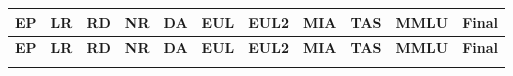 \documentclass[11pt]{article}
\begin{document}
\begin{longtable}[h]{|r|r|l|l|l|l|l|r|r|l|r|}
\hline
\multicolumn{1}{|c|}{\textbf{EP}} & \multicolumn{1}{c|}{\textbf{LR}} & \multicolumn{1}{c|}{\textbf{RD}} & \multicolumn{1}{c|}{\textbf{NR}} & \multicolumn{1}{c|}{\textbf{DA}} & \multicolumn{1}{c|}{\textbf{EUL}} & \multicolumn{1}{c|}{\textbf{EUL2}} & \multicolumn{1}{c|}{\textbf{MIA}} & \multicolumn{1}{c|}{\textbf{TAS}} & \multicolumn{1}{c|}{\textbf{MMLU}} & \multicolumn{1}{c|}{\textbf{Final}} \\ 
\hline
\endfirsthead

\hline
\multicolumn{1}{|c|}{\textbf{EP}} & \multicolumn{1}{c|}{\textbf{LR}} & \multicolumn{1}{c|}{\textbf{RD}} & \multicolumn{1}{c|}{\textbf{NR}} & \multicolumn{1}{c|}{\textbf{DA}} & \multicolumn{1}{c|}{\textbf{EUL}} & \multicolumn{1}{c|}{\textbf{EUL2}} & \multicolumn{1}{c|}{\textbf{MIA}} & \multicolumn{1}{c|}{\textbf{TAS}} & \multicolumn{1}{c|}{\textbf{MMLU}} & \multicolumn{1}{c|}{\textbf{Final}} \\
\hline
\endhead

\hline
\endfoot


\end{longtable}
\end{document}
